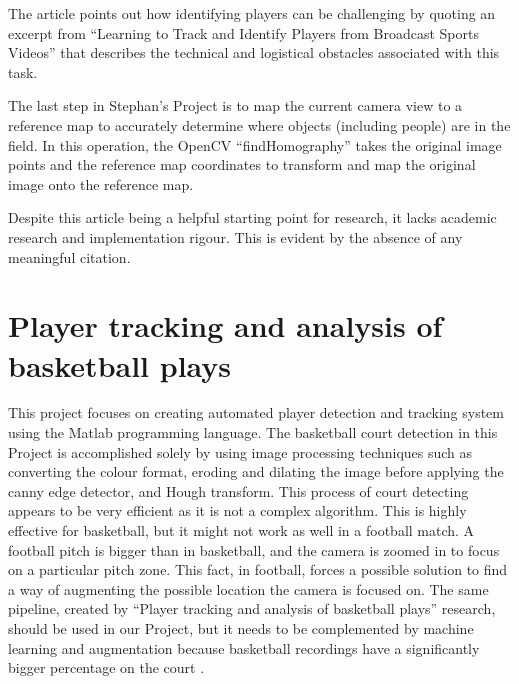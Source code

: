 \documentclass[
    11pt,
    oneside
]{report}
\begin{document}
The article points out how identifying players can be challenging by quoting an excerpt from ``Learning to Track and Identify Players from Broadcast Sports Videos'' \cite{learn_track_id} that describes the technical and logistical obstacles associated with this task.


The last step in Stephan's Project is to map the current camera view to a reference map to accurately determine where objects (including people) are in the field. In this operation, the OpenCV \cite{opencv} ``findHomography'' takes the original image points and the reference map coordinates to transform and map the original image onto the reference map.


Despite this article being a helpful starting point for research, it lacks academic research and implementation rigour. This is evident by the absence of any meaningful citation.


\section{Player tracking and analysis of basketball plays}

This project \cite{baskettrack} focuses on creating automated player detection and tracking system using the Matlab programming language. The basketball court detection in this Project is accomplished solely by using image processing techniques such as converting the colour format, eroding and dilating the image before applying the canny edge detector, and Hough transform. This process of court detecting appears to be very efficient as it is not a complex algorithm. This is highly effective for basketball, but it might not work as well in a football match. A football pitch is bigger than in basketball, and the camera is zoomed in to focus on a particular pitch zone. This fact, in football, forces a possible solution to find a way of augmenting the possible location the camera is focused on. The same pipeline, created by ``Player tracking and analysis of basketball plays'' research, should be used in our Project, but it needs to be complemented by machine learning and augmentation because basketball recordings have a significantly bigger percentage on the court \cite{baskettrack}.
\end{document}
